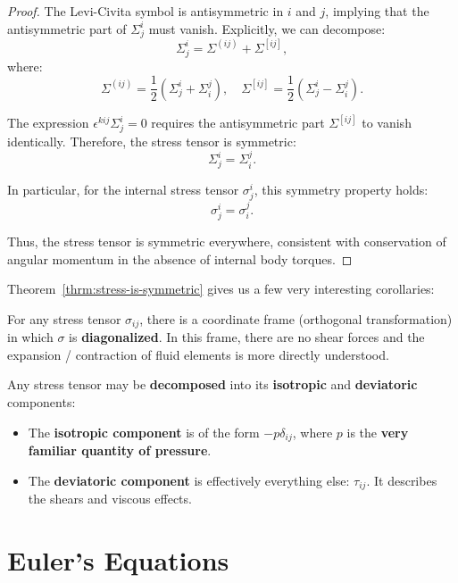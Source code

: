 \begin{proof}
The Levi-Civita symbol is antisymmetric in $i$ and $j$, implying that the antisymmetric part of $\Sigma^i_j$ must vanish. Explicitly, we can decompose:
\[
\Sigma^i_j = \Sigma^{(ij)} + \Sigma^{[ij]},
\]
where:
\[
\Sigma^{(ij)} = \frac{1}{2} \left( \Sigma^i_j + \Sigma^j_i \right), \quad \Sigma^{[ij]} = \frac{1}{2} \left( \Sigma^i_j - \Sigma^j_i \right).
\]

The expression $\epsilon^{kij} \Sigma^i_j = 0$ requires the antisymmetric part $\Sigma^{[ij]}$ to vanish identically. Therefore, the stress tensor is symmetric:
\[
\boxed{ \Sigma^i_j = \Sigma^j_i }.
\]

In particular, for the internal stress tensor $\sigma^i_j$, this symmetry property holds:
\[
\sigma^i_j = \sigma^j_i.
\]

Thus, the stress tensor is symmetric everywhere, consistent with conservation of angular momentum in the absence of internal body torques.

\end{proof}
\vspace{0.5cm}
Theorem~\ref{thrm:stress-is-symmetric} gives us a few very interesting corollaries:

\begin{corollary}
    For any stress tensor $\sigma_{ij}$, there is a coordinate frame (orthogonal transformation) in which $\sigma$ is \textbf{diagonalized}. In this frame, there are no shear forces and the expansion / contraction of fluid elements is more directly understood.
\end{corollary}

\begin{corollary}
    Any stress tensor may be \textbf{decomposed} into its \textbf{isotropic} and \textbf{deviatoric} components:
    
    \begin{itemize}
        \item The \textbf{isotropic component} is of the form $-p \delta_{ij}$, where $p$ is the \textbf{very familiar quantity of pressure}.
        \item The \textbf{deviatoric component} is effectively everything else: $\tau_{ij}$. It describes the shears and viscous effects.
    \end{itemize}
\end{corollary}

\section{Euler's Equations}

